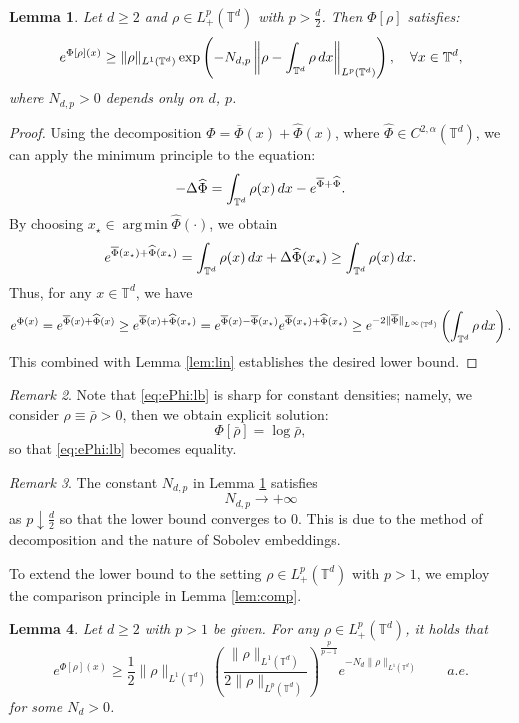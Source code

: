 \documentclass[11pt,reqno,a4paper]{amsart}
\newcommand{\intt}{\int_{\T^d}}
\newtheorem{lemma}{Lemma}[section]
\theoremstyle{definition}
\theoremstyle{remark}
\newtheorem{remark}[lemma]{Remark}
\numberwithin{equation}{section}
\DeclareMathOperator*{\argmin}{arg\,min}
\newcommand{\T} {\mathbb T}
\newcommand{\lt}{\left}
\newcommand{\rt}{\right}
\newcommand{\bq}{\begin{equation}}
\newcommand{\eq}{\end{equation}}
\newcommand{\dx}{\textnormal{d}x}
\begin{document}
\begin{lemma}\label{lem:ePhi}
Let $d\ge2$ and $\rho\in L^p_+(\T^d)$ with $p >\frac{d}{2}$. Then $\Phi[\rho]$ satisfies:
\begin{equation}\label{eq:ePhi:lb}
e^{\Phi[\rho](x)} \ge \|\rho\|_{L^1(\T^d)}\exp\lt({-N_{d,p}\lt\|\rho -\intt \rho\,\dx\rt\|_{L^p(\T^d)}}\rt), \quad \forall x\in\T^d,
\end{equation}
where $N_{d,p}>0$ depends only on $d$, $p$.
\end{lemma}
\begin{proof}
Using the decomposition $\Phi = \overline{\Phi}(x) +\widehat{\Phi}(x)$, where $\widehat{\Phi} \in C^{2,\alpha}(\T^d)$, we can apply the minimum principle to the equation:
    \begin{align*}
        -\Delta \widehat{\Phi} = \intt \rho(x)\,\dx - e^{\overline{\Phi} + \widehat{\Phi}}.
    \end{align*}
By choosing $x_\star \in \argmin \widehat{\Phi} (\cdot)$, we obtain
\[
e^{\overline{\Phi}(x_\star) + \widehat{\Phi}(x_\star)} = \intt \rho(x)\,\dx+ \Delta \widehat{\Phi}(x_\star) \ge   \intt \rho(x)\,\dx.
\]
Thus, for any $x \in \T^d$, we have
\[
e^{\Phi(x)} = e^{\overline{\Phi}(x) +\widehat{\Phi}(x)} \ge e^{\overline{\Phi}(x) + \widehat{\Phi}(x_\star)}  = e^{\overline{\Phi}(x) -\overline{\Phi}(x_\star)}e^{\overline{\Phi}(x_\star) + \widehat{\Phi}(x_\star)} \ge e^{-2\|\overline{\Phi}\|_{L^
\infty(\T^d)}} \lt(\intt \rho \,\dx\rt).
\]
This combined with Lemma \ref{lem:lin} establishes the desired lower bound.
\end{proof}
\begin{remark}
Note that \eqref{eq:ePhi:lb} is sharp for constant densities; namely, we consider $\rho \equiv \bar \rho >0$, then we obtain explicit solution:
\[
\Phi[\bar \rho]=\log \bar \rho,
\]
so that \eqref{eq:ePhi:lb} becomes equality.
\end{remark}
\begin{remark}
The constant $N_{d,p}$ in Lemma \ref{lem:ePhi} satisfies
\[
N_{d,p} \to +\infty
\]
as $p \downarrow \frac{d}{2}$ so that the lower bound converges to $0$. This is due to the method of decomposition and the nature of Sobolev embeddings.
\end{remark}

To extend the lower bound to the setting $\rho \in L^{p}_+(\T^d)$ with $p>1$, we employ the comparison principle in Lemma \ref{lem:comp}. 

\begin{lemma}\label{lem:ulb}
Let $d\ge2$ with $p>1$ be given. For any $\rho\in L^p_+(\T^d)$, it holds that
\bq\label{eq:cush}
e^{\Phi[\rho](x)} \ge \frac{1}{2}\|\rho\|_{L^1(\T^d)} \lt(\frac{\|\rho\|_{L^1(\T^d)}}{2\|\rho\|_{L^p(\T^d)}}\rt)^{\frac{p}{p-1}} e^{-N_d\|\rho\|_{L^1(\T^d)}}\qquad \textit{a.e.}
\eq
for some $N_d>0$.
\end{lemma}
\end{document}
